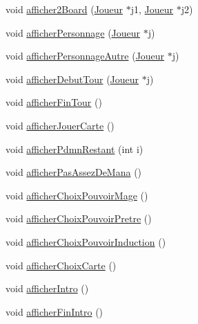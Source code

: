\begin{DoxyCompactItemize}
\item 
void \hyperlink{class_vue_console_af493448120cfaf5c389f741e30bc7b31}{afficher2\-Board} (\hyperlink{class_joueur}{Joueur} $\ast$j1, \hyperlink{class_joueur}{Joueur} $\ast$j2)
\item 
void \hyperlink{class_vue_console_ad450cc024c4c7797c18f399b0f4c321c}{afficher\-Personnage} (\hyperlink{class_joueur}{Joueur} $\ast$j)
\item 
void \hyperlink{class_vue_console_ae015f7453d65bb89abef4793addc18ca}{afficher\-Personnage\-Autre} (\hyperlink{class_joueur}{Joueur} $\ast$j)
\item 
void \hyperlink{class_vue_console_a64ad6e083263f0fadef29b98207cb2aa}{afficher\-Debut\-Tour} (\hyperlink{class_joueur}{Joueur} $\ast$j)
\item 
void \hyperlink{class_vue_console_ada125e06218ee32a5dbacc526e28a84c}{afficher\-Fin\-Tour} ()
\item 
void \hyperlink{class_vue_console_a0f4cab13a73ac5c80881276687a506aa}{afficher\-Jouer\-Carte} ()
\item 
void \hyperlink{class_vue_console_a9f1b65a45e8e3da31ae35fa6c4d53dce}{afficher\-Pdmn\-Restant} (int i)
\item 
void \hyperlink{class_vue_console_a2b469256d2776aa6e01ebc4bd393c2a3}{afficher\-Pas\-Assez\-De\-Mana} ()
\item 
void \hyperlink{class_vue_console_a525f3eacad711387238b37a9b64c5406}{afficher\-Choix\-Pouvoir\-Mage} ()
\item 
void \hyperlink{class_vue_console_ac1e6d5da6ce2c352d10c665d79c616d0}{afficher\-Choix\-Pouvoir\-Pretre} ()
\item 
void \hyperlink{class_vue_console_a884aeedbd65ebe011b86f42d6ae5db04}{afficher\-Choix\-Pouvoir\-Induction} ()
\item 
void \hyperlink{class_vue_console_ad55bf2d0d6397204cccfb488aad39c4e}{afficher\-Choix\-Carte} ()
\item 
void \hyperlink{class_vue_console_a1e9faf3a19588ff0f659dfff4cfcff09}{afficher\-Intro} ()
\item 
void \hyperlink{class_vue_console_a945e04f68fb5a0089e35b1b688001b87}{afficher\-Fin\-Intro} ()
\end{DoxyCompactItemize}


